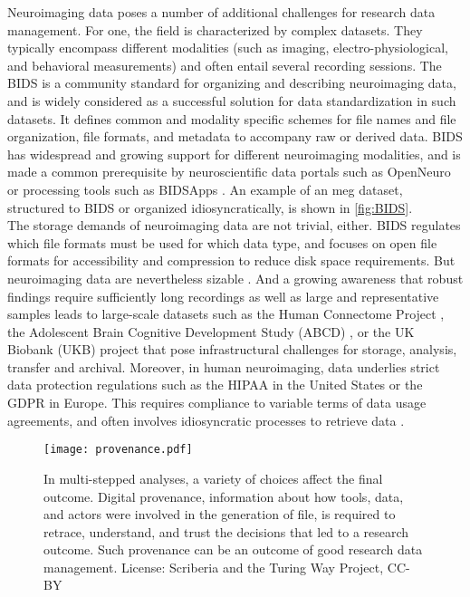 Neuroimaging data poses a number of additional challenges for research data management.
For one, the field is characterized by complex datasets.
They typically encompass different modalities (such as imaging, electro-physiological, and behavioral measurements) and often entail several recording sessions.
The \gls{BIDS} \citep{gorgolewski2016brain} is a community standard for organizing and describing neuroimaging data, and is widely considered as a successful solution for data standardization in such datasets.
It defines common and modality specific schemes for file names and file organization, file formats, and metadata to accompany raw or derived data.
\gls{BIDS} has widespread and growing support for different neuroimaging modalities, and is made a common prerequisite by neuroscientific data portals such as OpenNeuro \citep{markiewicz2021openneuro} or processing tools such as BIDSApps \citep{gorgolewski2017bids}.
An example of an \gls{meg} dataset, structured to \gls{BIDS} or organized idiosyncratically, is shown in \cref{fig:BIDS}. \\
The storage demands of neuroimaging data are not trivial, either.
\gls{BIDS} regulates which file formats must be used for which data type, and focuses on open file formats for accessibility and compression to reduce disk space requirements.
But neuroimaging data are nevertheless sizable \citep{van2014human}.
And a growing awareness that robust findings require sufficiently long recordings \citep{li2021moving} as well as large and representative samples \citep{button2013power} \citep{turner2018small} leads to large-scale datasets such as the Human Connectome Project \citep{van2013wu}, the Adolescent Brain Cognitive Development Study (ABCD) \citep{casey2018adolescent}, or the UK Biobank (UKB) project \citep{matthews2015uk} that pose infrastructural challenges for storage, analysis, transfer and archival.
Moreover, in human neuroimaging, data underlies strict data protection regulations such as the \gls{HIPAA} in the United States or the \gls{GDPR} in Europe.
This requires compliance to variable terms of data usage agreements, and often involves idiosyncratic processes to retrieve data \citep{waitedata}.

\begin{figure}
	\centering
	\texttt{[image: provenance.pdf]}
	\caption[Provenance throughout the research process]{In multi-stepped analyses, a variety of choices affect the final outcome. Digital provenance, information about how tools, data, and actors were involved in the generation of file, is required to retrace, understand, and trust the decisions that led to a research outcome. Such provenance can be an outcome of good research data management. License: Scriberia and the Turing Way Project, CC-BY}
	\label{fig:prov1}
\end{figure}

